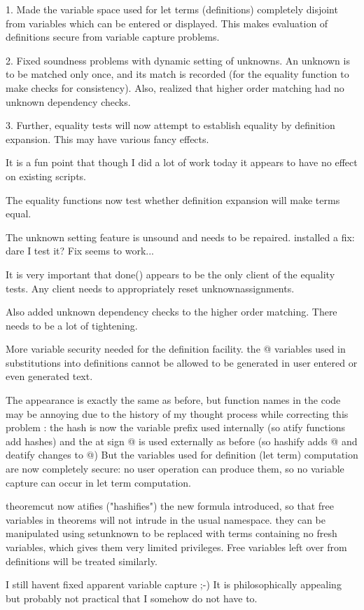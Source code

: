 \documentclass{article}
\begin{document}
\begin{description}
 1.  Made the variable space used for let terms (definitions) completely
 disjoint from variables which can be entered or displayed.  This makes
 evaluation of definitions secure from variable capture problems.

 2.  Fixed soundness problems with dynamic setting of unknowns.  An unknown is to be
 matched only once, and its match is recorded (for the equality function
 to make checks for consistency).  Also, realized that higher order matching
 had no unknown dependency checks.

 3.  Further, equality tests will now attempt to establish equality
 by definition expansion.  This may have various fancy effects.

 It is a fun point that though I did a lot of work today it appears
 to have no effect on existing scripts.

 \item[5/27/2026:]  The equality functions now test whether definition expansion will make terms equal.

 The unknown setting feature is unsound and needs to be repaired.
 installed a fix:  dare I test it?   Fix seems to work...

 It is very important that done() appears to be the only client
 of the equality tests.  Any client needs to appropriately reset
 unknownassignments.

 Also added unknown dependency checks to the higher order matching.
 There needs to be a lot of tightening.

 \item[5/27/2026:]  More variable security needed for the definition facility.
 the @ variables used in substitutions into definitions cannot be allowed
 to be generated in user entered or even generated text. 

  The appearance is exactly the same as before, but function
 names in the code may be annoying due to the history of my
 thought process while correcting this problem :
 the hash  is now the variable prefix used
 internally (so atify functions add hashes) and the at sign @ is used
 externally as before (so hashify adds @ and deatify changes  to @)
 But the variables used for definition (let term) computation
 are now completely secure:  no user operation can produce them, so
 no variable capture can occur in let term computation.

 theoremcut now atifies ("hashifies") the new formula introduced,
 so that free variables in theorems will not intrude in the usual namespace.
 they can be manipulated using setunknown to be replaced with terms
 containing no fresh variables, which gives them very limited privileges.
 Free variables left over from definitions will be treated similarly.

 I still havent fixed apparent variable capture ;-)  It is philosophically
 appealing but probably not practical that I somehow do not have to.
 
 \end{description}
\end{document}

